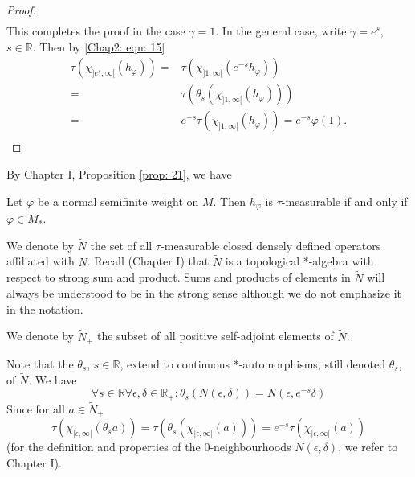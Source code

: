 \begin{proof}
\[\begin{split}
        \end{split}
    \]
    This completes the proof in the case $\gamma=1$. In the general case, write $\gamma=e^s$, $s\in \mathbb{R}$. Then by \eqref{Chap2: eqn: 15}
    \[
        \begin{split}
            \tau(\chi_{]e^s,\infty[}(h_\varphi))=&\tau(\chi_{]1,\infty[}(e^{-s}h_\varphi))\\
            =&\tau(\theta_s(\chi_{]1,\infty[}(h_\varphi)))\\
            =&e^{-s}\tau(\chi_{]1,\infty[}(h_\varphi))=e^{-s}\varphi(1).\\
        \end{split}
    \]
\end{proof}
By Chapter I, Proposition \ref{prop: 21}, we have
\begin{corollary}\label{Chap2: Coro: 6}
    Let $\varphi$ be a normal semifinite weight on $M$. Then $h_\varphi$ is $\tau$-measurable if and only if $\varphi\in M_*$.
\end{corollary}
We denote by $\tilde{N}$ the set of all $\tau$-measurable closed densely defined operators affiliated with $N$. Recall (Chapter I) that $\tilde{N}$ is a topological *-algebra with respect to strong sum and product. Sums and products of elements in $\tilde{N}$ will always be understood to be
in the strong sense although we do not emphasize it in the notation.\par
We denote by $\tilde{N}_+$ the subset of all positive self-adjoint elements of $\tilde{N}$.\par
Note that the $\theta_s$, $s\in \mathbb{R}$, extend to continuous *-automorphisms, still denoted $\theta_s$, of $\tilde{N}$. We have
\begin{equation}
    \forall s\in \mathbb{R} \forall \epsilon,\delta\in \mathbb{R}_+: \theta_s(N(\epsilon,\delta))=N(\epsilon,e^{-s}\delta)
\end{equation}
Since for all $a\in \tilde{N}_+$
\[
    \tau(\chi_{]\epsilon,\infty[}(\theta_sa))=\tau(\theta_s(\chi_{]\epsilon,\infty[}(a)))=e^{-s}\tau(\chi_{]\epsilon,\infty[}(a))
\]
(for the definition and properties of the $0$-neighbourhoods $N(\epsilon,\delta)$, we refer to Chapter I).

